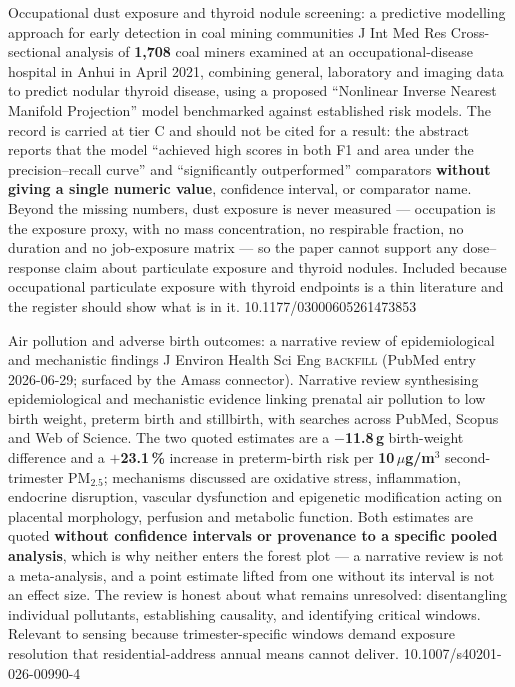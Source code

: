 \documentclass[10pt]{article}
\begin{document}

{Occupational dust exposure and thyroid nodule screening: a predictive modelling approach
for early detection in coal mining communities}
{J Int Med Res}
{Cross-sectional analysis of \textbf{1,708} coal miners examined at an occupational-disease
hospital in Anhui in April 2021, combining general, laboratory and imaging data to predict
nodular thyroid disease, using a proposed ``Nonlinear Inverse Nearest Manifold
Projection'' model benchmarked against established risk models. The record is carried at
tier C and should not be cited for a result: the abstract reports that the model
``achieved high scores in both F1 and area under the precision--recall curve'' and
``significantly outperformed'' comparators \textbf{without giving a single numeric value},
confidence interval, or comparator name. Beyond the missing numbers, dust exposure is
never measured --- occupation is the exposure proxy, with no mass concentration, no
respirable fraction, no duration and no job-exposure matrix --- so the paper cannot
support any dose--response claim about particulate exposure and thyroid nodules. Included
because occupational particulate exposure with thyroid endpoints is a thin literature and
the register should show what is in it.}
{10.1177/03000605261473853}


{Air pollution and adverse birth outcomes: a narrative review of epidemiological and
mechanistic findings}
{J Environ Health Sci Eng}
{\textsc{backfill} (PubMed entry 2026-06-29; surfaced by the Amass connector). Narrative
review synthesising epidemiological and mechanistic evidence linking prenatal air
pollution to low birth weight, preterm birth and stillbirth, with searches across PubMed,
Scopus and Web of Science. The two quoted estimates are a \textbf{$-$11.8\,g} birth-weight
difference and a \textbf{$+$23.1\,\%} increase in preterm-birth risk per
\textbf{10\,$\mu$g/m$^3$} second-trimester PM$_{2.5}$; mechanisms discussed are oxidative
stress, inflammation, endocrine disruption, vascular dysfunction and epigenetic
modification acting on placental morphology, perfusion and metabolic function. Both
estimates are quoted \textbf{without confidence intervals or provenance to a specific
pooled analysis}, which is why neither enters the forest plot --- a narrative review is
not a meta-analysis, and a point estimate lifted from one without its interval is not an
effect size. The review is honest about what remains unresolved: disentangling individual
pollutants, establishing causality, and identifying critical windows. Relevant to sensing
because trimester-specific windows demand exposure resolution that residential-address
annual means cannot deliver.}
{10.1007/s40201-026-00990-4}
\end{document}
